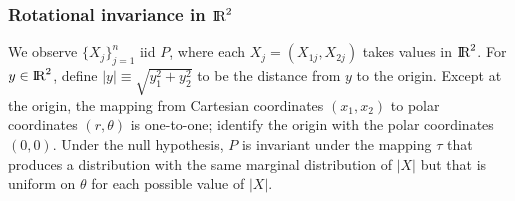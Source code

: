 \subsubsection{Rotational invariance in $\hbox{I\kern-.17em\hbox{R}}^2$}

We observe $\{X_j\}_{j=1}^n$ iid $P$, where each $X_j = (X_{1j}, X_{2j})$ takes values in $\hbox{I\kern-.17em\hbox{R}}^2$.
For $y \in \hbox{I\kern-.17em\hbox{R}}^2$, define $|y| \equiv \sqrt{y_1^2 + y_2^2}$ to be the distance from $y$ to
the origin.
Except at the origin, the mapping from Cartesian coordinates $(x_1, x_2)$ to polar coordinates
$(r, \theta)$ is one-to-one; identify
the origin with the polar coordinates $(0, 0)$.
Under the null hypothesis, $P$ is invariant under the mapping $\tau$ that produces
a distribution with the same marginal distribution of $|X|$ but that is uniform on
$\theta$ for each possible value of $|X|$.

